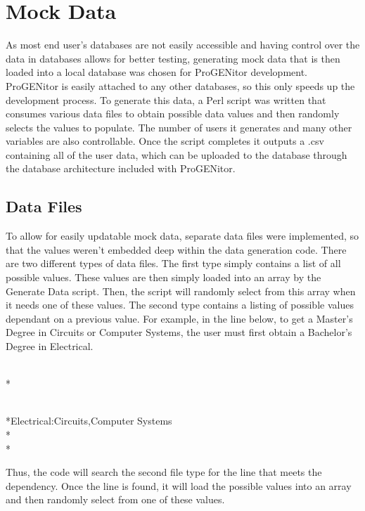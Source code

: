 \section{Mock Data}
\label{sect:mock-data}
As most end user's databases are not easily accessible and having control over
the data in databases allows for better testing, generating mock data that is
then loaded into a local database was chosen for ProGENitor development. 
ProGENitor is easily attached to any other databases, so this only speeds up the
development process.  To generate this data, a Perl script was written that
consumes various data files to obtain possible data values and then randomly
selects the values to populate.  The number of users it generates and many other
variables are also controllable.  Once the script completes it outputs a .csv
containing all of the user data, which can be uploaded to the database through
the database architecture included with ProGENitor.

\subsection{Data Files}
To allow for easily updatable mock data, separate data files were implemented,
so that the values weren't embedded deep within the data generation code.  There
are two different types of data files.  The first type simply contains a list
of all possible values.  These values are then simply loaded into an array by
the Generate Data script.  Then, the script will randomly select from this
array when it needs one of these values.  The second type contains a listing of
possible values dependant on a previous value.  For example, in the line below,
to get a Master's Degree in Circuits or Computer Systems, the user must first
obtain a Bachelor's Degree in Electrical.
\begin{footnotesize}
\\*\begin{tt}
\\*Electrical:Circuits,Computer Systems\\*
\\*\end{tt}
\end{footnotesize}
Thus, the code will search the second file type for the line that meets the
dependency.  Once the line is found, it will load the possible values into an
array and then randomly select from one of these values.

